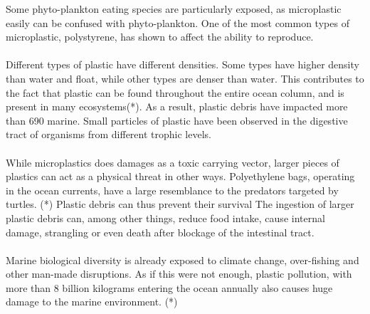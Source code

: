 Some phyto-plankton eating species are particularly exposed, as microplastic easily can be confused with phyto-plankton. One of the most common types of microplastic, polystyrene, has shown to affect the ability to reproduce. %
\\\\
Different types of plastic have different densities. Some types have higher density than water and float, while other types are denser than water. This contributes to the fact that plastic can be found throughout the entire ocean column, and is present in many ecosystems(*). As a result, plastic debris have impacted more than 690 marine. Small particles of plastic have been observed in the digestive tract of organisms from different trophic levels. 
\\\\
While microplastics does damages as a toxic carrying vector, larger pieces of plastics can act as a physical threat in other ways. Polyethylene bags, operating in the ocean currents, have a large resemblance to the predators targeted by turtles. (*) Plastic debris can thus prevent their survival %
The ingestion of larger plastic debris can, among other things, reduce food intake, cause internal damage, strangling or even death after blockage of the intestinal tract. %
\\\\
Marine biological diversity is already exposed to climate change, over-fishing and other man-made disruptions. As if this were not enough, plastic pollution, with more than 8 billion kilograms entering the ocean annually
also causes huge damage to the marine environment. (*)

